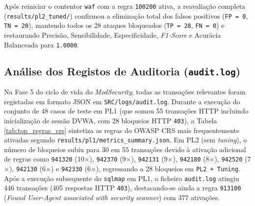 \documentclass[11pt,a4paper]{article}
\begin{document}
Após reiniciar o contentor \texttt{waf} com a regra \texttt{100200} ativa, a reavaliação completa (\texttt{results/\allowbreak pl2\_tuned/}) confirmou a eliminação total dos falsos positivos (\texttt{FP = 0}, \texttt{TN = 20}), mantendo todos os 28 ataques bloqueados (\texttt{TP = 28}, \texttt{FN = 0}) e restaurando Precisão, Sensibilidade, Especificidade, \textit{F1-Score} e Acurácia Balanceada para \texttt{1.0000}.

\newpage
\subsection{Análise dos Registos de Auditoria (\texttt{audit.log})}
Na Fase 5 do ciclo de vida do \textit{ModSecurity}, todas as transações relevantes foram registadas em formato JSON em \texttt{SRC/logs/audit.log}. Durante a execução do conjunto de 48 casos de teste em PL1 (que somou 55 transações HTTP incluindo inicialização de sessão DVWA, com 28 bloqueios HTTP \texttt{403}), a Tabela \ref{tab:top_regras_crs} sintetiza as regras do OWASP CRS mais frequentemente ativadas segundo \texttt{results/pl1/metrics\_summary.json}. Em PL2 (sem \textit{tuning}), o número de bloqueios subiu para 30 em 55 transações devido à ativação adicional de regras como \texttt{941320} (10$\times$), \texttt{942370} (9$\times$), \texttt{942131} (9$\times$), \texttt{942180} (8$\times$), \texttt{942520} (7$\times$), \texttt{942130} (6$\times$) e \texttt{942330} (6$\times$), regressando a 28 bloqueios em \texttt{PL2 + Tuning}. Após a execução subsequente do \texttt{sqlmap} em PL1, o ficheiro \texttt{audit.log} atingiu 446 transações (405 respostas HTTP \texttt{403}), destacando-se ainda a regra \texttt{913100} (\textit{Found User-Agent associated with security scanner}) com 377 ativações.
\end{document}
